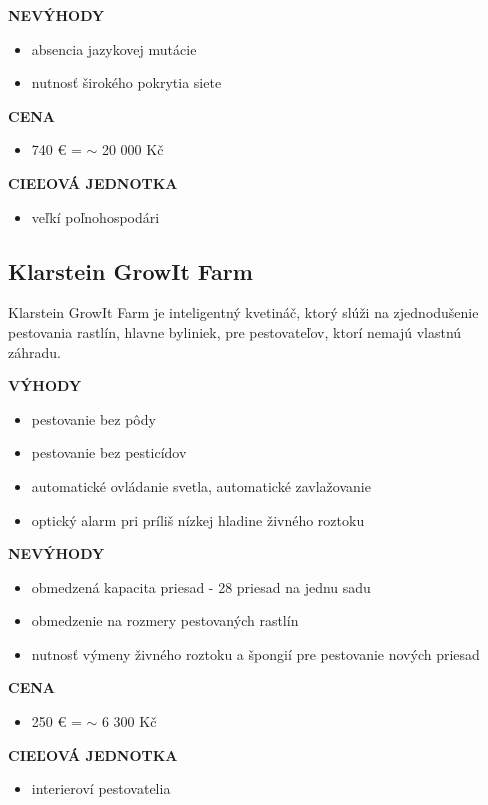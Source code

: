 \documentclass[twoside]{ctuthesis}
\theoremstyle{plain}
\theoremstyle{definition}
\theoremstyle{note}
\begin{document}
\textbf{NEVÝHODY}
\begin{itemize}
\item absencia jazykovej mutácie
\item nutnosť širokého pokrytia siete
\end{itemize}
	
\textbf{CENA}
\begin{itemize}
\item 740 €  = $\sim$ 20 000 Kč 
\end{itemize}

\textbf{CIEĽOVÁ JEDNOTKA}
\begin{itemize}
\item veľkí poľnohospodári
\end{itemize}


\subsection*{Klarstein GrowIt Farm}
Klarstein GrowIt Farm je inteligentný kvetináč, ktorý slúži na zjednodušenie pestovania rastlín, hlavne byliniek, pre pestovateľov, ktorí nemajú vlastnú záhradu.  \cite{klarstein}
\newline

\textbf{VÝHODY}
\begin{itemize}
\item pestovanie bez pôdy
\item pestovanie bez pesticídov
\item automatické ovládanie svetla, automatické zavlažovanie
\item optický alarm pri príliš nízkej hladine živného roztoku
\end{itemize}

\textbf{NEVÝHODY}
\begin{itemize}
\item obmedzená kapacita priesad - 28 priesad na jednu sadu
\item obmedzenie na rozmery pestovaných rastlín
\item nutnosť výmeny živného roztoku a špongií pre pestovanie nových priesad
 \end{itemize}

\textbf{CENA}
\begin{itemize}
\item 250 €  =  $\sim$ 6 300 Kč 
 \end{itemize}

\textbf{CIEĽOVÁ JEDNOTKA}
\begin{itemize}
\item interieroví pestovatelia
\end{itemize}
\end{document}
